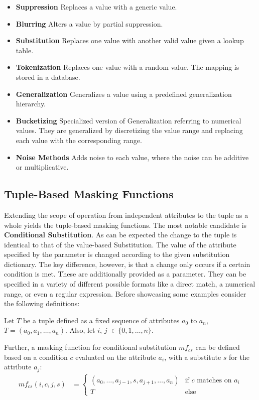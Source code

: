 \begin{itemize}
    \item \textbf{Suppression} Replaces a value with a generic value.
    \item \textbf{Blurring} Alters a value by partial suppression.
    \item \textbf{Substitution} Replaces one value with another valid value given a lookup table.
    \item \textbf{Tokenization} Replaces one value with a random value. The mapping is stored in a database.
    \item \textbf{Generalization} Generalizes a value using a predefined generalization hierarchy. 
    \item \textbf{Bucketizing} Specialized version of Generalization referring to numerical values. They are generalized by discretizing the value range and replacing each value with the corresponding range. 
    \item \textbf{Noise Methods} Adds noise to each value, where the noise can be additive or multiplicative.
\end{itemize}


\subsection{Tuple-Based Masking Functions}
Extending the scope of operation from independent attributes to the tuple as a whole yields the tuple-based masking functions. The most notable candidate is \textbf{Conditional Substitution}. As can be expected the change to the tuple is identical to that of the value-based Substitution. The value of the attribute specified by the parameter is changed according to the given substitution dictionary. The key difference, however, is that a change only occurs if a certain condition is met. These are additionally provided as a parameter. They can be specified in a variety of different possible formats like a direct match, a numerical range, or even a regular expression. Before showcasing some examples consider the following definitions: \par

Let $T$ be a tuple defined as a fixed sequence of attributes $a_0$ to $a_n$, $T = (a_0, a_1, \dots, a_n)$. Also, let $i$, $j$ $\in \{0,1, \dots, n\}$. \par

Further, a masking function for conditional substitution $mf_{cs}$ can be defined based on a condition $c$ evaluated on the attribute $a_i$, with a substitute $s$ for the attribute $a_j$:
\vspace{-0.8em}
\[
\begin{aligned}
mf_{cs}(i, c, j, s) &= 
\begin{cases}
    (a_0, \dots, a_{j-1}, s, a_{j+1}, \dots, a_n) & \text{if } c \text{ matches on } a_i \\
    T & \text{else}
\end{cases}
\end{aligned}
\]

